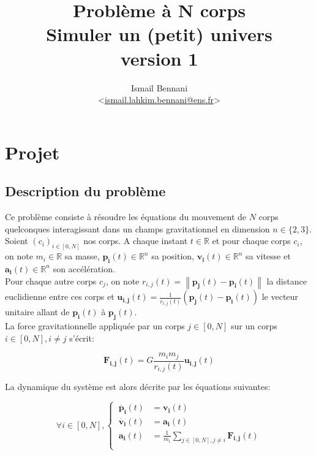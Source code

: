 \documentclass{article}
\title{\textbf{Problème à N corps} \\
       \Large Simuler un (petit) univers\\
       \small version 1}
\author{Ismail Bennani \\
        <\href{mailto:ismail.lahkim.bennani@ens.fr}{ismail.lahkim.bennani@ens.fr}>}
\date{}
\newcommand{\norm}[1]{\left\lVert#1\right\rVert}
\newcommand{\myvec}[1]{\ensuremath{\mathbf{#1}}}
\begin{document}
\maketitle

\section{Projet}
\label{projet}

\subsection{Description du problème}

Ce problème consiste à résoudre les équations du mouvement de $N$ corps quelconques interagissant dans un champs gravitationnel en dimension ${n\in \{ 2,3 \}}$. \\
Soient $(c_i)_{i\in[0,N]}$ nos corps. A chaque instant $t \in \mathbb{R}$ et pour chaque corps $c_i$, on note $m_i \in \mathbb{R}$ sa masse, $\myvec{p_i}(t) \in \mathbb{R}^n$ sa position, $\myvec{v_i}(t) \in \mathbb{R}^n$ sa vitesse et $\myvec{a_i}(t) \in \mathbb{R}^n$ son accélération.\\
Pour chaque autre corps $c_j$, on note $r_{i,j}(t) = \norm{\myvec{p_j}(t) - \myvec{p_i}(t)}$ la distance euclidienne entre ces corps et $\myvec{u_{i,j}}(t) = \frac{1}{r_{i,j}(t)}(\myvec{p_j}(t)-\myvec{p_i}(t))$ le vecteur unitaire allant de $\myvec{p_i}(t)$ à $\myvec{p_j}(t)$.\\

La force gravitationnelle appliquée par un corps $j \in [0,N]$ sur un corps $i \in [0,N], i \ne j$ s'écrit:

\begin{equation*}
    \myvec{F_{i,j}}(t) = G \frac{m_im_j}{r_{i,j}(t)} \myvec{u_{i,j}}(t)
\end{equation*}

La dynamique du système est alors décrite par les équations suivantes:

\begin{equation*}
\forall i \in [0,N], \left\{\begin{aligned}
    \ \myvec{\dot{p_i}}(t) & = \myvec{v_i}(t) \\
    \ \myvec{\dot{v_i}}(t) & = \myvec{a_i}(t) \\
    \ \myvec{a_i}(t) & = \frac{1}{m_i} \sum_{j \in [0,N], j \ne i} \myvec{F_{i,j}}(t) \\
\end{aligned}\right.
\end{equation*}
\end{document}
